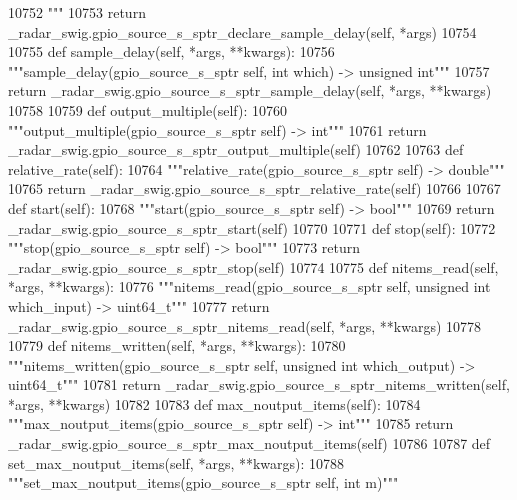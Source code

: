 \begin{DoxyCode}
{{{{{{{{{{{{{{{{{{{{{{{{{{{{{{{{{{10752 \textcolor{stringliteral}{        """}
10753         \textcolor{keywordflow}{return} \_radar\_swig.gpio\_source\_s\_sptr\_declare\_sample\_delay(self, *args)
10754 
10755     \textcolor{keyword}{def }sample_delay(self, *args, **kwargs):
10756         \textcolor{stringliteral}{"""sample\_delay(gpio\_source\_s\_sptr self, int which) -> unsigned int"""}
10757         \textcolor{keywordflow}{return} \_radar\_swig.gpio\_source\_s\_sptr\_sample\_delay(self, *args, **kwargs)
10758 
10759     \textcolor{keyword}{def }output_multiple(self):
10760         \textcolor{stringliteral}{"""output\_multiple(gpio\_source\_s\_sptr self) -> int"""}
10761         \textcolor{keywordflow}{return} \_radar\_swig.gpio\_source\_s\_sptr\_output\_multiple(self)
10762 
10763     \textcolor{keyword}{def }relative_rate(self):
10764         \textcolor{stringliteral}{"""relative\_rate(gpio\_source\_s\_sptr self) -> double"""}
10765         \textcolor{keywordflow}{return} \_radar\_swig.gpio\_source\_s\_sptr\_relative\_rate(self)
10766 
10767     \textcolor{keyword}{def }start(self):
10768         \textcolor{stringliteral}{"""start(gpio\_source\_s\_sptr self) -> bool"""}
10769         \textcolor{keywordflow}{return} \_radar\_swig.gpio\_source\_s\_sptr\_start(self)
10770 
10771     \textcolor{keyword}{def }stop(self):
10772         \textcolor{stringliteral}{"""stop(gpio\_source\_s\_sptr self) -> bool"""}
10773         \textcolor{keywordflow}{return} \_radar\_swig.gpio\_source\_s\_sptr\_stop(self)
10774 
10775     \textcolor{keyword}{def }nitems_read(self, *args, **kwargs):
10776         \textcolor{stringliteral}{"""nitems\_read(gpio\_source\_s\_sptr self, unsigned int which\_input) -> uint64\_t"""}
10777         \textcolor{keywordflow}{return} \_radar\_swig.gpio\_source\_s\_sptr\_nitems\_read(self, *args, **kwargs)
10778 
10779     \textcolor{keyword}{def }nitems_written(self, *args, **kwargs):
10780         \textcolor{stringliteral}{"""nitems\_written(gpio\_source\_s\_sptr self, unsigned int which\_output) -> uint64\_t"""}
10781         \textcolor{keywordflow}{return} \_radar\_swig.gpio\_source\_s\_sptr\_nitems\_written(self, *args, **kwargs)
10782 
10783     \textcolor{keyword}{def }max_noutput_items(self):
10784         \textcolor{stringliteral}{"""max\_noutput\_items(gpio\_source\_s\_sptr self) -> int"""}
10785         \textcolor{keywordflow}{return} \_radar\_swig.gpio\_source\_s\_sptr\_max\_noutput\_items(self)
10786 
10787     \textcolor{keyword}{def }set_max_noutput_items(self, *args, **kwargs):
10788         \textcolor{stringliteral}{"""set\_max\_noutput\_items(gpio\_source\_s\_sptr self, int m)"""}
}}}}}}}}}}}}}}}}}}}}}}}}}}}}}}}}}}
\end{DoxyCode}
